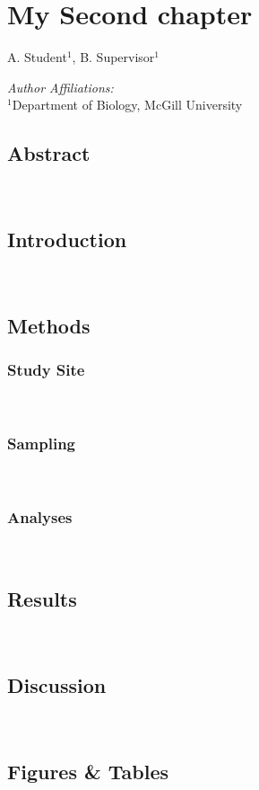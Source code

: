 \chapter{My Second chapter}
\begin{center}
{A. Student$^{1}$, B. Supervisor$^{1}$}\\
\end{center}
\textit{Author Affiliations:}\\
\normalsize{$^{1}$Department of Biology, McGill University}\\
\section{Abstract}
\lipsum[66]
\\
\section{Introduction}
\lipsum[66]
\\
\section{Methods}

\subsection*{Study Site}
\lipsum[66]\\
\subsection*{Sampling}
\lipsum[66]\\
\subsection*{Analyses}
\lipsum[66]\\
\section{Results}
\lipsum[66]\\
\section{Discussion}
\lipsum[66]\\

\newpage
\section*{Figures \& Tables}
